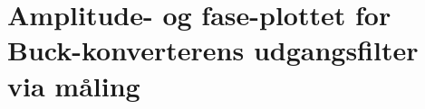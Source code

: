 \section{Amplitude- og fase-plottet for Buck-konverterens udgangsfilter via måling}\label{sec:spm2}

